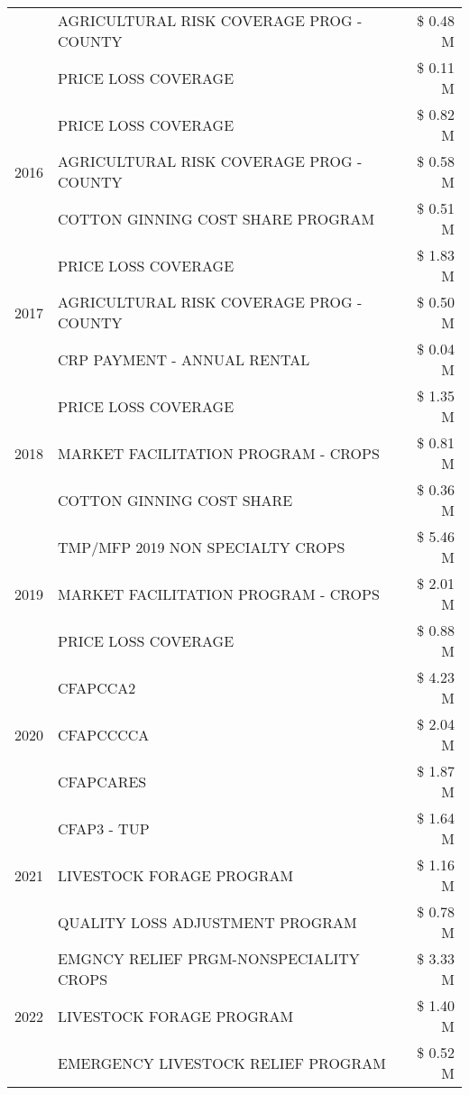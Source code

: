 \begin{tabular}{llr}
 & AGRICULTURAL RISK COVERAGE PROG - COUNTY & \$ 0.48 M \\
 & PRICE LOSS COVERAGE & \$ 0.11 M \\
\cline{1-3}
\multirow[t]{3}{*}{2016} & PRICE LOSS COVERAGE & \$ 0.82 M \\
 & AGRICULTURAL RISK COVERAGE PROG - COUNTY & \$ 0.58 M \\
 & COTTON GINNING COST SHARE PROGRAM & \$ 0.51 M \\
\cline{1-3}
\multirow[t]{3}{*}{2017} & PRICE LOSS COVERAGE & \$ 1.83 M \\
 & AGRICULTURAL RISK COVERAGE PROG - COUNTY & \$ 0.50 M \\
 & CRP PAYMENT - ANNUAL RENTAL & \$ 0.04 M \\
\cline{1-3}
\multirow[t]{3}{*}{2018} & PRICE LOSS COVERAGE & \$ 1.35 M \\
 & MARKET FACILITATION PROGRAM - CROPS & \$ 0.81 M \\
 & COTTON GINNING COST SHARE & \$ 0.36 M \\
\cline{1-3}
\multirow[t]{3}{*}{2019} & TMP/MFP 2019 NON SPECIALTY CROPS & \$ 5.46 M \\
 & MARKET FACILITATION PROGRAM - CROPS & \$ 2.01 M \\
 & PRICE LOSS COVERAGE & \$ 0.88 M \\
\cline{1-3}
\multirow[t]{3}{*}{2020} & CFAPCCA2 & \$ 4.23 M \\
 & CFAPCCCCA & \$ 2.04 M \\
 & CFAPCARES & \$ 1.87 M \\
\cline{1-3}
\multirow[t]{3}{*}{2021} & CFAP3 - TUP & \$ 1.64 M \\
 & LIVESTOCK FORAGE PROGRAM & \$ 1.16 M \\
 & QUALITY LOSS ADJUSTMENT PROGRAM & \$ 0.78 M \\
\cline{1-3}
\multirow[t]{3}{*}{2022} & EMGNCY RELIEF PRGM-NONSPECIALITY CROPS & \$ 3.33 M \\
 & LIVESTOCK FORAGE PROGRAM & \$ 1.40 M \\
 & EMERGENCY LIVESTOCK RELIEF PROGRAM & \$ 0.52 M \\
\cline{1-3}
\bottomrule
\end{tabular}
